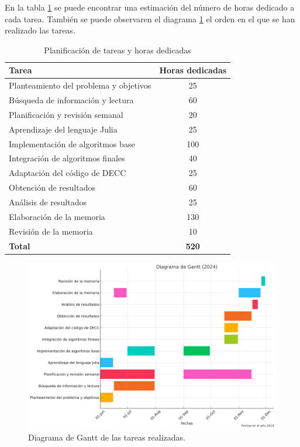 En la tabla \ref{planificacion} se puede encontrar una estimación del número de horas dedicado a cada tarea. También se puede observaren el diagrama \ref{Gaant} el orden en el que se han realizado las tareas.

\begin{table}[ht]
\centering
\caption{Planificación de tareas y horas dedicadas}
\label{planificacion}
\begin{tabular}{|l|c|}
\hline
\textbf{Tarea} & \textbf{Horas dedicadas} \\ \hline
Planteamiento del problema y objetivos & 25 \\ \hline
Búsqueda de información y lectura & 60 \\ \hline
Planificación y revisión semanal & 20 \\ \hline
Aprendizaje del lenguaje Julia & 25 \\ \hline
Implementación de algoritmos base & 100 \\ \hline
Integración de algoritmos finales & 40 \\ \hline
Adaptación del código de DECC & 25 \\ \hline
Obtención de resultados & 60 \\ \hline
Análisis de resultados & 25 \\ \hline
Elaboración de la memoria & 130 \\ \hline
Revisión de la memoria & 10 \\ \hline
\textbf{Total} & \textbf{520} \\ \hline
\end{tabular}
\end{table}

\begin{figure}[h!]
	\vspace{2cm}
    \centering
    \includegraphics[width=\textwidth]{images/Diagrama_Gantt.png}
    \caption{Diagrama de Gantt de las tareas realizadas.}
    \label{Gaant}
\end{figure}

